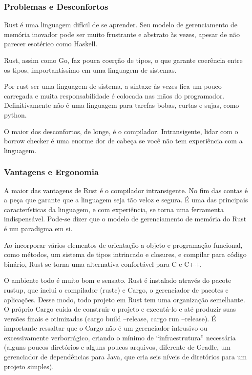\documentclass{article}
\begin{document}
\subsubsection{Problemas e Desconfortos}
\label{sssec:rust problemas}

Rust é uma linguagem difícil de se aprender. Seu modelo de gerenciamento de memória inovador pode ser muito frustrante e abstrato às vezes, apesar de não parecer esotérico como Haskell.

Rust, assim como Go, faz pouca coerção de tipos, o que garante coerência entre os tipos, importantíssimo em uma linguagem de sistemas.

Por rust ser uma linguagem de sistema, a sintaxe às vezes fica um pouco carregada e muita responsabilidade é colocada nas mãos do programador. Definitivamente não é uma linguagem para tarefas bobas, curtas e sujas, como python.

O maior dos desconfortos, de longe, é o compilador. Intransigente, lidar com o borrow checker é uma enorme dor de cabeça se você não tem experiência com a linguagem.

\subsubsection{Vantagens e Ergonomia}
\label{sssec:rust vantagens}

A maior das vantagens de Rust é o compilador intransigente. No fim das contas é a peça que garante que a linguagem seja tão veloz e segura. É uma das principais características da linguagem, e com experiência, se torna uma ferramenta indispensável. Pode-se dizer que o modelo de gerenciamento de memória do Rust é um paradigma em si.

Ao incorporar vários elementos de orientação a objeto e programação funcional, como métodos, um sistema de tipos intrincado e closures, e compilar para código binário, Rust se torna uma alternativa confortável para C e C++.

O ambiente todo é muito bom e sensato. Rust é instalado através do pacote rustup, que inclui o compilador (rustc) e Cargo, o gerenciador de pacotes e aplicações. Desse modo, todo projeto em Rust tem uma organização semelhante. O próprio Cargo cuida de construir o projeto e executá-lo e até produzir suas versões finais e otimizadas (cargo build --release, cargo run --release). É importante ressaltar que o Cargo não é um gerenciador intrusivo ou excessivamente verborrágico, criando o mínimo de ``infraestrutura'' necessária (alguns poucos diretórios e alguns poucos arquivos, diferente de Gradle, um gerenciador de dependências para Java, que cria seis níveis de diretórios para um projeto simples).
\end{document}
